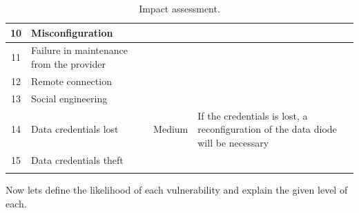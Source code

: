 \documentclass[a4paper,10pt]{article}
\begin{document}
\begin{longtable}{|c|p{2.5cm}|c|p{10cm}|}
\hline
10 & Misconfiguration & & \\
\hline
11 & Failure in maintenance from the provider & & \\
\hline
12 & Remote connection & & \\
\hline
13 & Social engineering  & & \\
\hline
14 & Data credentials lost & Medium & If the credentials is lost, a reconfiguration of the data diode will be necessary \\
\hline
15 & Data credentials theft & & \\
\hline
\caption{Impact assessment.}
\label{tab:impact}
\end{longtable}

Now lets define the likelihood of each vulnerability and explain the given level of each.
\end{document}
